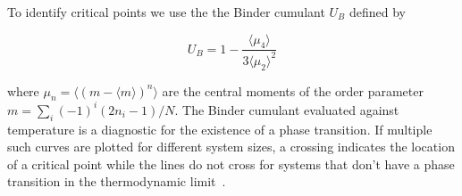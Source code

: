 To identify critical points we use the the Binder cumulant \(U_B\) defined by

\[
U_B = 1 - \frac{\langle\mu_4\rangle}{3\langle\mu_2\rangle^2}
\]

where \(\mu_n = \langle(m - \langle m\rangle)^n\rangle\) are the central moments of the order parameter \(m = \sum_i (-1)^i (2n_i - 1) / N\). The Binder cumulant evaluated against temperature is a diagnostic for the existence of a phase transition. If multiple such curves are plotted for different system sizes, a crossing indicates the location of a critical point while the lines do not cross for systems that don't have a phase transition in the thermodynamic limit~\autocite{binderFiniteSizeScaling1981,musialMonteCarloSimulations2002}.
